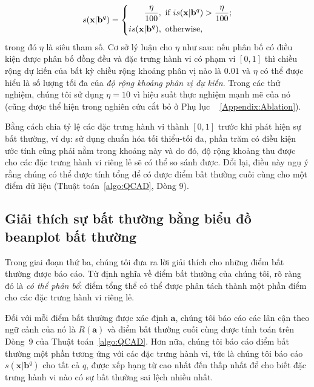 \begin{equation}
\centering
s(\mathbf{x}\rvert\mathbf{b}^{q})=\left\{
\begin{aligned} \frac{\eta}{100} &, \text{ if } is(\mathbf{x}\rvert\mathbf{b}^{q}) > \frac{\eta}{100}; \\
is(\mathbf{x}\rvert\mathbf{b}^{q})&, \text{ otherwise}, \\
\end{aligned}
\right.
\label{eq6}
\end{equation}trong đó $\eta$ là siêu tham số. Cơ sở lý luận cho $\eta$ như sau: nếu phân bố có điều kiện được phân bố đồng đều và đặc trưng hành vi có phạm vi $[0,1]$ thì chiều rộng dự kiến ​​của bất kỳ chiều rộng khoảng phân vị nào là $0.01$ và $\eta$ có thể được hiểu là số lượng tối đa của \emph{độ rộng khoảng phân vị dự kiến}. Trong các thử nghiệm, chúng tôi sử dụng $\eta = 10$ vì hiệu suất thực nghiệm mạnh mẽ của nó (cũng được thể hiện trong nghiên cứu cắt bỏ ở Phụ lục ~ \ref{Appendix:Ablation}).

Bằng cách chia tỷ lệ các đặc trưng hành vi thành $[0,1]$ trước khi phát hiện sự bất thường, ví dụ: sử dụng chuẩn hóa tối thiểu-tối đa, phần trăm có điều kiện ước tính cũng phải nằm trong khoảng này và do đó, độ rộng khoảng thu được cho các đặc trưng hành vi riêng lẻ sẽ có thể so sánh được. Đổi lại, điều này ngụ ý rằng chúng có thể được tính tổng để có được điểm bất thường cuối cùng cho một điểm dữ liệu (Thuật toán~\ref{algo:QCAD}, Dòng 9).

\subsection{Giải thích sự bất thường bằng biểu đồ beanplot bất thường}
\label{qcad:ae}

Trong giai đoạn thứ ba, chúng tôi đưa ra lời giải thích cho những điểm bất thường được báo cáo. Từ định nghĩa về điểm bất thường của chúng tôi, rõ ràng đó là \textit{có thể phân bổ}: điểm tổng thể có thể được phân tách thành một phần điểm cho các đặc trưng hành vi riêng lẻ.

Đối với mỗi điểm bất thường được xác định $\mathbf{a}$, chúng tôi báo cáo các lân cận theo ngữ cảnh của nó là $R(\mathbf{a})$ và điểm bất thường cuối cùng được tính toán trên Dòng~9 của Thuật toán~\ref{algo:QCAD}. Hơn nữa, chúng tôi báo cáo điểm bất thường một phần tương ứng với các đặc trưng hành vi, tức là chúng tôi báo cáo $s(\mathbf{x}\rvert\mathbf{b}^{q})$ cho tất cả $q$, được xếp hạng từ cao nhất đến thấp nhất để cho biết đặc trưng hành vi nào có sự bất thường sai lệch nhiều nhất.


